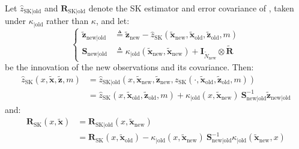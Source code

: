 \begin{proposition}\label{th:kriging_update}
	Let $\hat{z}_{\mathrm{SK}|\mathrm{old}}$ and $\mathbf{R}_{\mathrm{SK}|\mathrm{old}}$ denote the SK estimator and error covariance of , taken under $\kappa_{|\mathrm{old}}$ rather than $\kappa$, and let:
	\begin{equation}
		\left\{\begin{aligned}
		\tilde{\mathbf{z}}_{\mathrm{new}|\mathrm{old}}&\triangleq\tilde{\mathbf{z}}_{\mathrm{new}}-\hat{z}_{\mathrm{SK}}(\tilde{\mathbf{x}}_{\mathrm{new}},\tilde{\mathbf{x}}_{\mathrm{old}},\tilde{\mathbf{z}}_{\mathrm{old}},m)\\
		\mathbf{S}_{\mathrm{new}|\mathrm{old}}&\triangleq \kappa_{|\mathrm{old}}(\tilde{\mathbf{x}}_{\mathrm{new}},\tilde{\mathbf{x}}_{\mathrm{new}})+\mathbf{I}_{\tilde{N}_{\mathrm{new}}}\otimes\tilde{\mathbf{R}}
		\end{aligned}\right.
	\end{equation}
	be the innovation of the new observations and its covariance. Then:
	\begin{equation}
		\begin{aligned}
		\hat{z}_{\mathrm{SK}}(x,\tilde{\mathbf{x}},\tilde{\mathbf{z}},m)&=\hat{z}_{\mathrm{SK}|\mathrm{old}}\left(x,\tilde{\mathbf{x}}_{\mathrm{new}},\tilde{\mathbf{z}}_{\mathrm{new}},\hat{z}_{\mathrm{SK}}(\cdot,\tilde{\mathbf{x}}_{\mathrm{old}},\tilde{\mathbf{z}}_{\mathrm{old}},m)\right)\\
		&=\hat{z}_{\mathrm{SK}}(x,\tilde{\mathbf{x}}_{\mathrm{old}},\tilde{\mathbf{z}}_{\mathrm{old}},m)+\kappa_{|\mathrm{old}}(x,\tilde{\mathbf{x}}_{\mathrm{new}})\:\mathbf{S}_{\mathrm{new}|\mathrm{old}}^{-1}\tilde{\mathbf{z}}_{\mathrm{new}|\mathrm{old}}
		\end{aligned}
	\end{equation}
	and:
	\begin{equation}
		\begin{aligned}
		\mathbf{R}_{\mathrm{SK}}(x,\tilde{\mathbf{x}})&=\mathbf{R}_{\mathrm{SK}|\mathrm{old}}(x,\tilde{\mathbf{x}}_{\mathrm{new}})\\
		&=\mathbf{R}_{\mathrm{SK}}(x,\tilde{\mathbf{x}}_{\mathrm{old}})-\kappa_{|\mathrm{old}}(x,\tilde{\mathbf{x}}_{\mathrm{new}})\:\mathbf{S}_{\mathrm{new}|\mathrm{old}}^{-1}\kappa_{|\mathrm{old}}(\tilde{\mathbf{x}}_{\mathrm{new}},x)
		\end{aligned}
	\end{equation}
\end{proposition}


